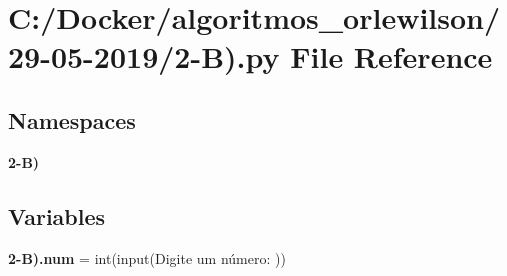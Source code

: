 \section{C\+:/\+Docker/algoritmos\+\_\+orlewilson/29-\/05-\/2019/2-\/B).py File Reference}
\label{2-_b_08_8py}
\subsection*{Namespaces}
\begin{DoxyCompactItemize}
\item 
 \textbf{ 2-\/\+B)}
\end{DoxyCompactItemize}
\subsection*{Variables}
\begin{DoxyCompactItemize}
\item 
\textbf{ 2-\/\+B).\+num} = int(input(\textquotesingle{}Digite um número\+: \textquotesingle{}))
\end{DoxyCompactItemize}
